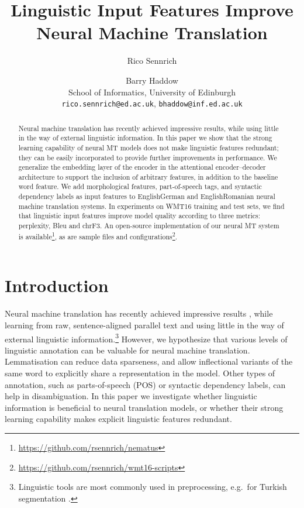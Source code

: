 \documentclass[11pt]{article}
\title{Linguistic Input Features Improve Neural Machine Translation}
\author{
Rico Sennrich \and Barry Haddow\\
School of Informatics, University of Edinburgh\\
{\tt rico.sennrich@ed.ac.uk}, {\tt bhaddow@inf.ed.ac.uk}
}
\date{}
\begin{document}
\maketitle
\begin{abstract}

Neural machine translation has recently achieved impressive results, while using little in the way of external linguistic information.
In this paper we show that the strong learning capability of neural MT models does not make linguistic features redundant; they can be easily incorporated to provide further improvements in performance. 
We generalize the embedding layer of the encoder in the attentional encoder--decoder architecture to support the inclusion of arbitrary features, in addition to the baseline word feature.
We add morphological features, part-of-speech tags, and syntactic dependency labels as input features to EnglishGerman and EnglishRomanian neural machine translation systems.
In experiments on WMT16 training and test sets, we find that linguistic input features improve model quality according to three metrics: perplexity, {\sc Bleu} and {\sc chrF3}. 
An open-source implementation of our neural MT system is available\footnote{\url{https://github.com/rsennrich/nematus}}, as are sample files and configurations\footnote{\url{https://github.com/rsennrich/wmt16-scripts}}.
\end{abstract}

\section{Introduction}

Neural machine translation has recently achieved impressive results \cite{DBLP:journals/corr/BahdanauCB14,jean15b},
while learning from raw, sentence-aligned parallel text and using little in the way of external linguistic information.\footnote{Linguistic tools are most commonly used in preprocessing, e.g.\ for Turkish segmentation \cite{DBLP:journals/corr/GulcehreFXCBLBS15}.}
However, we hypothesize that various levels of linguistic annotation can be valuable for neural machine translation.
Lemmatisation can reduce data sparseness, and allow inflectional variants of the same word to explicitly share a representation in the model.
Other types of annotation, such as parts-of-speech (POS) or syntactic dependency labels, can help in disambiguation.
In this paper we investigate whether linguistic information is beneficial to neural translation models, or whether their strong learning capability makes explicit linguistic features redundant.
\end{document}
